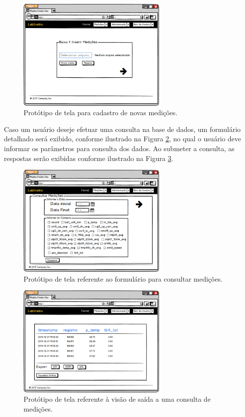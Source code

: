 \begin{figure}[H]
	\centering
	\includegraphics[width=0.65\textwidth]{./img/telas/tela053.png}
	\caption{Protótipo de tela para cadastro de novas medições.} \label{fig:tela053}
\end{figure}

Caso um usuário deseje efetuar uma consulta na base de dados, um formulário detalhado será exibido, conforme ilustrado na Figura  \ref{fig:tela058}, no qual o usuário deve informar os parâmetros para consulta dos dados. Ao submeter a consulta, as respostas serão exibidas conforme ilustrado na Figura \ref{fig:tela062}.

\begin{figure}[H]
	\centering
	\includegraphics[width=0.65\textwidth]{./img/telas/tela058.png}
	\caption{Protótipo de tela referente ao formulário para consultar medições.} \label{fig:tela058}
\end{figure}

\begin{figure}[H]
	\centering
	\includegraphics[width=0.65\textwidth]{./img/telas/tela062.png}
	\caption{Protótipo de tela referente à visão de saída a uma consulta de medições.} \label{fig:tela062}
\end{figure}

